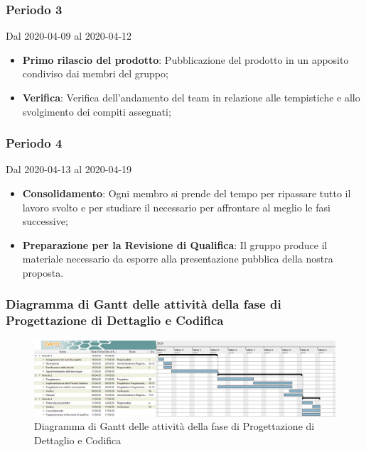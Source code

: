 \subsubsection{Periodo 3}
Dal 2020-04-09 al 2020-04-12\\
\begin{itemize}
	\item \textbf{Primo rilascio del prodotto}: Pubblicazione del prodotto in un apposito  condiviso dai membri del gruppo;
	\item \textbf{Verifica}: Verifica dell'andamento del team in relazione alle tempistiche e allo svolgimento dei compiti assegnati;
\end{itemize}
\subsubsection{Periodo 4} 
Dal 2020-04-13 al 2020-04-19\\
\begin{itemize}
	\item \textbf{Consolidamento}: Ogni membro si prende del tempo per ripassare tutto il lavoro svolto e per studiare il necessario per affrontare al meglio le fasi successive;
	\item \textbf{Preparazione per la Revisione di Qualifica}: Il gruppo produce il materiale necessario da esporre alla presentazione pubblica della nostra proposta.
\end{itemize}

\newpage
\begin{landscape}
\subsubsection{Diagramma di Gantt delle attività della fase di Progettazione di Dettaglio e Codifica}
\pagestyle{empty}
\begin{figure}[h]
	\centering
	\includegraphics[scale=0.476]{Sezioni/DiagrammiGantt/ProgettazioneDiDettaglio.png}
	\caption{Diagramma di Gantt delle attività della fase di Progettazione di Dettaglio e Codifica}
\end{figure}
\end{landscape}


